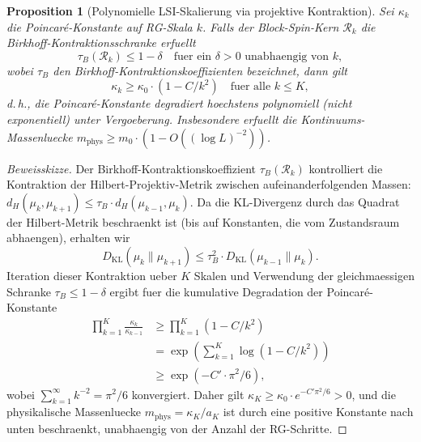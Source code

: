 \documentclass[12pt,a4paper]{article}
\theoremstyle{definition}
\theoremstyle{plain}
\newtheorem{proposition}[definition]{Proposition}
\theoremstyle{remark}
\begin{document}
\begin{proposition}[Polynomielle LSI-Skalierung via projektive Kontraktion]
\label{prop:polynomial-lsi}
Sei $\kappa_k$ die Poincar\'e-Konstante auf RG-Skala $k$. Falls der Block-Spin-Kern $\mathcal{R}_k$ die Birkhoff-Kontraktionsschranke erfuellt
\[
\tau_B(\mathcal{R}_k) \leq 1 - \delta \quad \text{fuer ein } \delta > 0 \text{ unabhaengig von } k,
\]
wobei $\tau_B$ den Birkhoff-Kontraktionskoeffizienten bezeichnet, dann gilt
\[
\kappa_k \geq \kappa_0 \cdot (1 - C/k^2) \quad \text{fuer alle } k \leq K,
\]
d.\,h., die Poincar\'e-Konstante degradiert hoechstens polynomiell (nicht exponentiell) unter Vergoeberung. Insbesondere erfuellt die Kontinuums-Massenluecke $m_{\mathrm{phys}} \geq m_0 \cdot (1 - O((\log L)^{-2}))$.
\end{proposition}

\begin{proof}[Beweisskizze]
Der Birkhoff-Kontraktionskoeffizient $\tau_B(\mathcal{R}_k)$ kontrolliert die Kontraktion der Hilbert-Projektiv-Metrik zwischen aufeinanderfolgenden Massen: $d_H(\mu_k, \mu_{k+1}) \leq \tau_B \cdot d_H(\mu_{k-1}, \mu_k)$. Da die KL-Divergenz durch das Quadrat der Hilbert-Metrik beschraenkt ist (bis auf Konstanten, die vom Zustandsraum abhaengen), erhalten wir
\[
D_{\mathrm{KL}}(\mu_k \| \mu_{k+1}) \leq \tau_B^2 \cdot D_{\mathrm{KL}}(\mu_{k-1} \| \mu_k).
\]
Iteration dieser Kontraktion ueber $K$ Skalen und Verwendung der gleichmaessigen Schranke $\tau_B \leq 1 - \delta$ ergibt fuer die kumulative Degradation der Poincar\'e-Konstante
\[
\begin{aligned}
\prod_{k=1}^{K} \frac{\kappa_k}{\kappa_{k-1}}
&\geq \prod_{k=1}^{K} (1 - C/k^2)\\
&= \exp\!\left(\sum_{k=1}^{K} \log(1 - C/k^2)\right)\\
&\geq \exp(-C' \cdot \pi^2/6),
\end{aligned}
\]
wobei $\sum_{k=1}^{\infty} k^{-2} = \pi^2/6$ konvergiert. Daher gilt $\kappa_K \geq \kappa_0 \cdot e^{-C'\pi^2/6} > 0$, und die physikalische Massenluecke $m_{\mathrm{phys}} = \kappa_K / a_K$ ist durch eine positive Konstante nach unten beschraenkt, unabhaengig von der Anzahl der RG-Schritte.
\end{proof}
\end{document}
